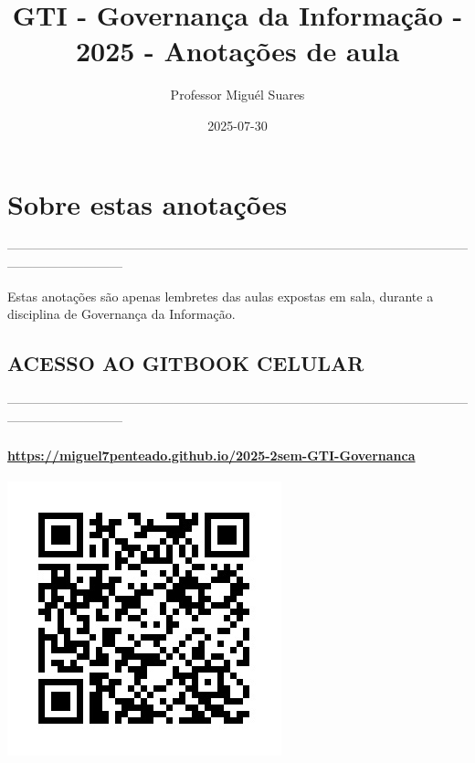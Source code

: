 \documentclass[
]{book}
\title{GTI - Governança da Informação - 2025 - Anotações de aula}
\author{Professor Miguél Suares}
\date{2025-07-30}
\begin{document}
\maketitle

{
\setcounter{tocdepth}{1}
\tableofcontents
}
\chapter*{Sobre estas anotações}\label{sobre-estas-anotauxe7uxf5es}

---------------------------------------------------------------------------------------------------------------------------------------

Estas anotações são apenas lembretes das aulas expostas em sala, durante a disciplina de Governança da Informação.

\section{ACESSO AO GITBOOK CELULAR}\label{acesso-ao-gitbook-celular}

---------------------------------------------------------------------------------------------------------------------------------------

\subsubsection{\texorpdfstring{\url{https://miguel7penteado.github.io/2025-2sem-GTI-Governanca}}{https://miguel7penteado.github.io/2025-2sem-GTI-Governanca}}\label{httpsmiguel7penteado.github.io2025-2sem-gti-governanca}

\includegraphics{images/qr-code-disciplina.jpg}
\end{document}
